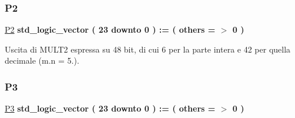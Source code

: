 \subsubsection{\texorpdfstring{P2}{P2}}
{\footnotesize\ttfamily \hyperlink{group___linear_regression_gab0bf0189296a8c52f6e36c853c8d3a77}{P2} {\bfseries \textcolor{vhdlchar}{std\+\_\+logic\+\_\+vector}\textcolor{vhdlchar}{ }\textcolor{vhdlchar}{(}\textcolor{vhdlchar}{ }\textcolor{vhdlchar}{ } \textcolor{vhdldigit}{23} \textcolor{vhdlchar}{ }\textcolor{vhdlchar}{downto}\textcolor{vhdlchar}{ }\textcolor{vhdlchar}{ } \textcolor{vhdldigit}{0} \textcolor{vhdlchar}{ }\textcolor{vhdlchar}{)}\textcolor{vhdlchar}{ }\textcolor{vhdlchar}{ }\textcolor{vhdlchar}{ }\textcolor{vhdlchar}{\+:}\textcolor{vhdlchar}{=}\textcolor{vhdlchar}{ }\textcolor{vhdlchar}{(}\textcolor{vhdlchar}{ }\textcolor{vhdlchar}{ }\textcolor{vhdlchar}{others}\textcolor{vhdlchar}{ }\textcolor{vhdlchar}{ }\textcolor{vhdlchar}{=}\textcolor{vhdlchar}{ }\textcolor{vhdlchar}{$>$}\textcolor{vhdlchar}{ }\textcolor{vhdlchar}{\textquotesingle{}}\textcolor{vhdlchar}{ } \textcolor{vhdldigit}{0} \textcolor{vhdlchar}{ }\textcolor{vhdlchar}{\textquotesingle{}}\textcolor{vhdlchar}{ }\textcolor{vhdlchar}{)}\textcolor{vhdlchar}{ }} \hspace{0.3cm}{\ttfamily [Signal]}}

Uscita di M\+U\+L\+T2 espressa su 48 bit, di cui 6 per la parte intera e 42 per quella decimale (m.\+n = 5.). \mbox{\label{group___linear_regression_gaa427886ed37e5d29753362483ce7fae2}} 
\subsubsection{\texorpdfstring{P3}{P3}}
{\footnotesize\ttfamily \hyperlink{group___linear_regression_gaa427886ed37e5d29753362483ce7fae2}{P3} {\bfseries \textcolor{vhdlchar}{std\+\_\+logic\+\_\+vector}\textcolor{vhdlchar}{ }\textcolor{vhdlchar}{(}\textcolor{vhdlchar}{ }\textcolor{vhdlchar}{ } \textcolor{vhdldigit}{23} \textcolor{vhdlchar}{ }\textcolor{vhdlchar}{downto}\textcolor{vhdlchar}{ }\textcolor{vhdlchar}{ } \textcolor{vhdldigit}{0} \textcolor{vhdlchar}{ }\textcolor{vhdlchar}{)}\textcolor{vhdlchar}{ }\textcolor{vhdlchar}{ }\textcolor{vhdlchar}{ }\textcolor{vhdlchar}{\+:}\textcolor{vhdlchar}{=}\textcolor{vhdlchar}{ }\textcolor{vhdlchar}{(}\textcolor{vhdlchar}{ }\textcolor{vhdlchar}{ }\textcolor{vhdlchar}{others}\textcolor{vhdlchar}{ }\textcolor{vhdlchar}{ }\textcolor{vhdlchar}{=}\textcolor{vhdlchar}{ }\textcolor{vhdlchar}{$>$}\textcolor{vhdlchar}{ }\textcolor{vhdlchar}{\textquotesingle{}}\textcolor{vhdlchar}{ } \textcolor{vhdldigit}{0} \textcolor{vhdlchar}{ }\textcolor{vhdlchar}{\textquotesingle{}}\textcolor{vhdlchar}{ }\textcolor{vhdlchar}{)}\textcolor{vhdlchar}{ }} \hspace{0.3cm}{\ttfamily [Signal]}}

